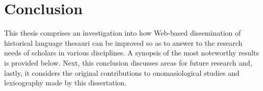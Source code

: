 \setcounter{chapter}{10}
\chapter*{Conclusion}





This thesis comprises an investigation into how Web-based dissemination of historical language thesauri can be improved so as to answer to the research needs of scholars in various disciplines. A synopsis of the most noteworthy results is provided below. Next, this conclusion discusses areas for future research and, lastly, it considers the original contributions to onomasiological studies and lexicography made by this dissertation.





